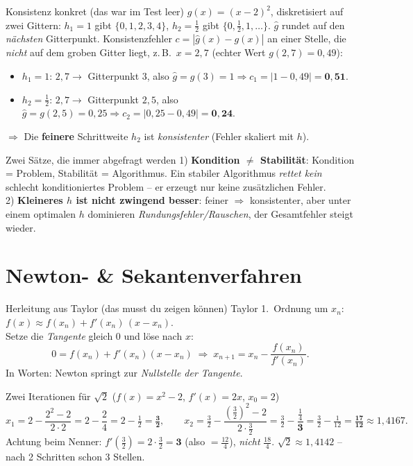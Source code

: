 \documentclass[a4paper,11pt]{article}
\begin{document}
\begin{bsp}{Konsistenz konkret (das war im Test leer)}
$g(x)=(x-2)^2$, diskretisiert auf zwei Gittern: $h_1=1$ gibt $\{0,1,2,3,4\}$, $h_2=\tfrac12$ gibt
$\{0,\tfrac12,1,\dots\}$. $\hat g$ rundet auf den \emph{nächsten} Gitterpunkt. Konsistenzfehler
$c=|\hat g(x)-g(x)|$ an einer Stelle, die \emph{nicht} auf dem groben Gitter liegt, z.\,B.\ $x=2{,}7$
(echter Wert $g(2{,}7)=0{,}49$):
\begin{itemize}
\item $h_1=1$: $2{,}7\to$ Gitterpunkt $3$, also $\hat g=g(3)=1\Rightarrow c_1=|1-0{,}49|=\mathbf{0{,}51}$.
\item $h_2=\tfrac12$: $2{,}7\to$ Gitterpunkt $2{,}5$, also $\hat g=g(2{,}5)=0{,}25\Rightarrow
  c_2=|0{,}25-0{,}49|=\mathbf{0{,}24}$.
\end{itemize}
$\Rightarrow$ Die \textbf{feinere} Schrittweite $h_2$ ist \emph{konsistenter} (Fehler skaliert mit $h$).
\end{bsp}

\begin{falle}{Zwei Sätze, die immer abgefragt werden}
1) \textbf{Kondition $\ne$ Stabilität}: Kondition = Problem, Stabilität = Algorithmus. Ein stabiler
Algorithmus \emph{rettet kein} schlecht konditioniertes Problem -- er erzeugt nur keine zusätzlichen
Fehler.\\
2) \textbf{Kleineres $h$ ist nicht zwingend besser}: feiner $\Rightarrow$ konsistenter, aber unter
einem optimalen $h$ dominieren \emph{Rundungsfehler/Rauschen}, der Gesamtfehler steigt wieder.
\end{falle}

\section{Newton- \& Sekantenverfahren}

\begin{satz}{Herleitung aus Taylor (das musst du zeigen können)}
Taylor 1.\ Ordnung um $x_n$:\quad $f(x)\approx f(x_n)+f'(x_n)\,(x-x_n)$.\\
Setze die \emph{Tangente} gleich $0$ und löse nach $x$:
\[
  0=f(x_n)+f'(x_n)(x-x_n)\;\Longrightarrow\;
  x_{n+1}=x_n-\frac{f(x_n)}{f'(x_n)}.
\]
In Worten: Newton springt zur \emph{Nullstelle der Tangente}.
\end{satz}

\begin{bsp}{Zwei Iterationen für $\sqrt2$ ($f(x)=x^2-2$, $f'(x)=2x$, $x_0=2$)}
\[
x_1=2-\frac{2^2-2}{2\cdot 2}=2-\frac{2}{4}=2-\tfrac12=\mathbf{\tfrac32},\qquad
x_2=\tfrac32-\frac{(\tfrac32)^2-2}{2\cdot\tfrac32}=\tfrac32-\frac{\tfrac14}{\mathbf{3}}
=\tfrac32-\tfrac1{12}=\mathbf{\tfrac{17}{12}}\approx1{,}4167.
\]
Achtung beim Nenner: $f'(\tfrac32)=2\cdot\tfrac32=\mathbf{3}$ (also $=\tfrac{12}{4}$), \emph{nicht}
$\tfrac{18}{4}$. $\sqrt2\approx1{,}4142$ -- nach 2 Schritten schon 3 Stellen.
\end{bsp}
\end{document}
